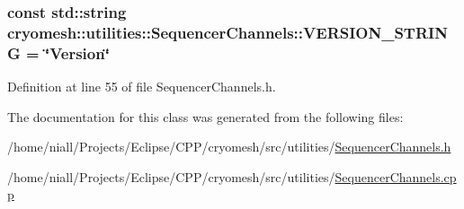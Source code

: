 \hypertarget{classcryomesh_1_1utilities_1_1SequencerChannels_a8083e83370f3791b81930be9a00273c6}{
\subsubsection[{\-V\-E\-R\-S\-I\-O\-N\-\_\-\-S\-T\-R\-I\-N\-G}]{\setlength{\rightskip}{0pt plus 5cm}const std\-::string {\bf cryomesh\-::utilities\-::\-Sequencer\-Channels\-::\-V\-E\-R\-S\-I\-O\-N\-\_\-\-S\-T\-R\-I\-N\-G} = \char`\"{}\-Version\char`\"{}}}\label{classcryomesh_1_1utilities_1_1SequencerChannels_a8083e83370f3791b81930be9a00273c6}


\-Definition at line 55 of file \-Sequencer\-Channels.\-h.



\-The documentation for this class was generated from the following files\-:\begin{DoxyCompactItemize}
\item 
/home/niall/\-Projects/\-Eclipse/\-C\-P\-P/cryomesh/src/utilities/\hyperlink{SequencerChannels_8h}{\-Sequencer\-Channels.\-h}\item 
/home/niall/\-Projects/\-Eclipse/\-C\-P\-P/cryomesh/src/utilities/\hyperlink{SequencerChannels_8cpp}{\-Sequencer\-Channels.\-cpp}\end{DoxyCompactItemize}
